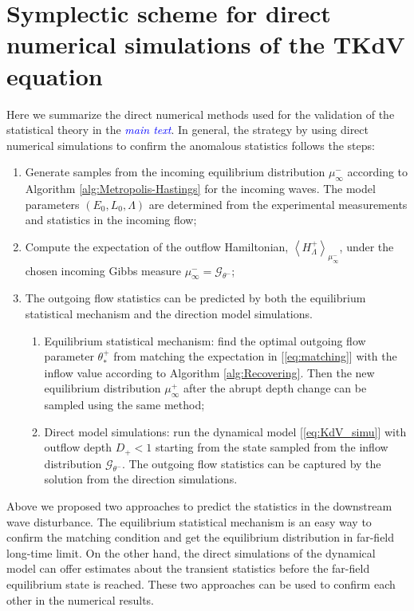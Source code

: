 \documentclass[9pt,twoside,lineno]{pnas-new}
\theoremstyle{plain}
\theoremstyle{plain}
\begin{document}
\section{Symplectic scheme for direct numerical simulations of the TKdV equation}

Here we summarize the direct numerical methods used for the validation
of the statistical theory in the \textcolor{blue}{\emph{main text}}. In general, the
strategy by using direct numerical simulations to confirm the anomalous
statistics follows the steps:
\begin{enumerate}
\item Generate samples from the incoming equilibrium distribution $\mu_{\infty}^{-}$
according to Algorithm \ref{alg:Metropolis-Hastings} for the incoming
waves. The model parameters $\left(E_{0},L_{0},\Lambda\right)$ are
determined from the experimental measurements and statistics in the
incoming flow;
\item Compute the expectation of the outflow Hamiltonian, $\left\langle H_{\Lambda}^{+}\right\rangle _{\mu_{\infty}^{-}}$,
under the chosen incoming Gibbs measure $\mu_{\infty}^{-}=\mathcal{G}_{\theta^{-}}$;
\item The outgoing flow statistics can be predicted by both the equilibrium
statistical mechanism and the direction model simulations. 
\begin{enumerate}
\item Equilibrium statistical mechanism: find the optimal outgoing flow
parameter $\theta_{*}^{+}$ from matching the expectation in [\ref{eq:matching}]
with the inflow value according to Algorithm \ref{alg:Recovering}.
Then the new equilibrium distribution $\mu_{\infty}^{+}$ after the
abrupt depth change can be sampled using the same method;
\item Direct model simulations: run the dynamical model [\ref{eq:KdV_simu}]
with outflow depth $D_{+}<1$ starting from the state sampled from
the inflow distribution $\mathcal{G}_{\theta^{-}}$. The outgoing
flow statistics can be captured by the solution from the direction
simulations. 
\end{enumerate}
\end{enumerate}
Above we proposed two approaches to predict the statistics in the
downstream wave disturbance. The equilibrium statistical mechanism
is an easy way to confirm the matching condition and get the equilibrium
distribution in far-field long-time limit. On the other hand, the
direct simulations of the dynamical model can offer estimates about
the transient statistics before the far-field equilibrium state is
reached. These two approaches can be used to confirm each other in
the numerical results.
\end{document}

